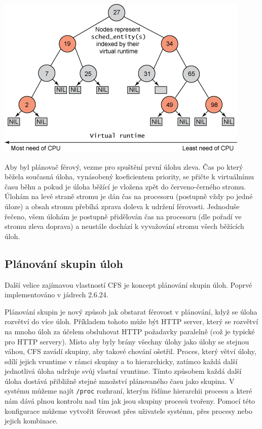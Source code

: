 \documentclass[a4paper,12pt]{article}
\begin{document}
\includegraphics[scale=1]{obrazky/RBT_virtual_runtime.png}

Aby byl plánovač férový, vezme pro spuštění první úlohu zleva. Čas po který běžela současná úloha, vynásobený koeficientem priority, se přičte k virtuálnímu času běhu a pokud je úloha běžící je vložena zpět do červeno-černého stromu. Úlohám na levé straně stromu je dán čas na procesoru (postupně vždy po jedné úloze) a obsah stromu přebíhá zprava doleva k udržení férovosti. Jednoduše řečeno, všem úlohám je postupně přidělován čas na procesoru (dle pořadí ve stromu zleva doprava) a neustále dochází k vyvažování stromu všech běžících úloh.

\subsection{Plánování skupin úloh}

Další velice zajímavou vlastností CFS je koncept plánování skupin úloh. Poprvé implementováno v jádrech 2.6.24. 

Plánování skupin je nový způsob jak obstarat férovost v plánování, když se úloha rozvětví do více úloh. Příkladem tohoto může být HTTP server, který se rozvětví na mnoho úloh za účelem obsluhovat HTTP požadavky paralelně (což je typické pro HTTP servery). Místo aby byly brány všechny úlohy jako úlohy se stejnou váhou, CFS zavádí skupiny, aby takové chování ošetřil. Proces, který větví úlohy, sdílí jejich vruntime v rámci skupiny a to hierarchicky, zatímco každá další jednotlivá úloha udržuje svůj vlastní vruntime. Tímto způsobem každá další úloha dostává přibližně stejné množství plánovaného času jako skupina. V systému můžeme najít \verb#/proc# rozhraní, kterým řídíme hierarchii procesu a které nám dává plnou kontrolu nad tím jak jsou skupiny procesů tvořeny. Pomocí této konfigurace můžeme vytvořit férovost přes uživatele systému, přes procesy nebo jejich kombinace.
\end{document}
